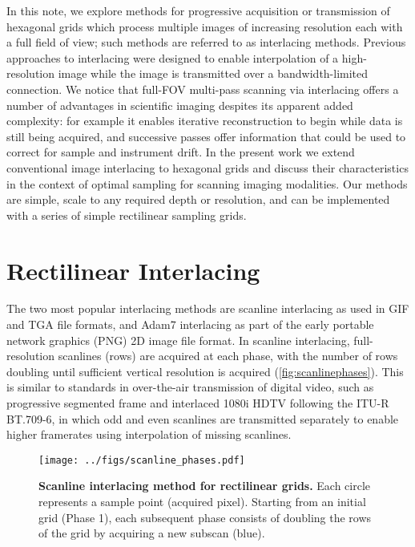 \documentclass[aip, amsmath, amssymb, nobibnotes, nofootinbib, citeautoscript, reprint, superscriptaddress]{revtex4-1}
\begin{document}
    In this note, we explore methods for progressive acquisition or transmission of hexagonal grids which process multiple images of increasing resolution each with a full field of view; such methods are referred to as interlacing methods.
    Previous approaches to interlacing were designed to enable interpolation of a high-resolution image while the image is transmitted over a bandwidth-limited connection.
    We notice that full-FOV multi-pass scanning via interlacing offers a number of advantages in scientific imaging despites its apparent added complexity: for example it enables iterative reconstruction to begin while data is still being acquired, and successive passes offer information that could be used to correct for sample and instrument drift.
    In the present work we extend conventional image interlacing to hexagonal grids and discuss their characteristics in the context of optimal sampling for scanning imaging modalities.
    Our methods are simple, scale to any required depth or resolution, and can be implemented with a series of simple rectilinear sampling grids.

    \section{\label{sec:rect}Rectilinear Interlacing}

    The two most popular interlacing methods are scanline interlacing as used in GIF and TGA file formats, and Adam7 interlacing as part of the early portable network graphics (PNG) 2D image file format\cite{png}.
    In scanline interlacing, full-resolution scanlines (rows) are acquired at each phase, with the number of rows doubling until sufficient vertical resolution is acquired (\autoref{fig:scanlinephases}).
    This is similar to standards in over-the-air transmission of digital video, such as progressive segmented frame and interlaced 1080i HDTV following the ITU-R BT.709-6\cite{hdtv}, in which odd and even scanlines are transmitted separately to enable higher framerates using interpolation of missing scanlines.

    \begin{figure*}
        \centering
        \texttt{[image: ../figs/scanline\_phases.pdf]}
            \caption{
                \label{fig:scanlinephases}
                \textbf{Scanline interlacing method for rectilinear grids.}
                Each circle represents a sample point (acquired pixel).
                Starting from an initial grid (Phase 1), each subsequent phase consists of
                doubling the rows of the grid by acquiring a new subscan (blue).
                }
    \end{figure*}
\end{document}
